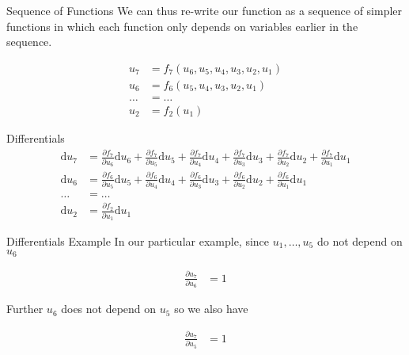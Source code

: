 \documentclass{beamer}
\begin{document}
\begin{frame}[fragile]{Sequence of Functions}
We can thus re-write our function as a sequence of simpler functions
in which each function only depends on variables earlier in the
sequence.

$$
\begin{aligned}
u_7    &= f_7(u_6, u_5, u_4, u_3, u_2, u_1) \\
u_6    &= f_6(u_5, u_4, u_3, u_2, u_1) \\
\ldots &= \ldots \\
u_2    &= f_2(u_1)
\end{aligned}
$$
\end{frame}

\begin{frame}[fragile]{Differentials}
$$
\begin{aligned}
\mathrm{d}u_7    &= \frac{\partial f_7}{\partial u_6} \mathrm{d} u_6 +
                    \frac{\partial f_7}{\partial u_5} \mathrm{d} u_5 +
                    \frac{\partial f_7}{\partial u_4} \mathrm{d} u_4 +
                    \frac{\partial f_7}{\partial u_3} \mathrm{d} u_3 +
                    \frac{\partial f_7}{\partial u_2} \mathrm{d} u_2 +
                    \frac{\partial f_7}{\partial u_1} \mathrm{d} u_1 \\
\mathrm{d}u_6    &= \frac{\partial f_6}{\partial u_5} \mathrm{d} u_5 +
                    \frac{\partial f_6}{\partial u_4} \mathrm{d} u_4 +
                    \frac{\partial f_6}{\partial u_3} \mathrm{d} u_3 +
                    \frac{\partial f_6}{\partial u_2} \mathrm{d} u_2 +
                    \frac{\partial f_6}{\partial u_1} \mathrm{d} u_1 \\
\ldots           &= \ldots \\
\mathrm{d}u_2    &= \frac{\partial f_2}{\partial u_1} \mathrm{d} u_1
\end{aligned}
$$
\end{frame}

\begin{frame}[fragile]{Differentials Example}
In our particular example, since $u_1, \dots, u_5$ do not depend on $u_6$

$$
\begin{aligned}
\frac{\partial u_7}{\partial u_6} &= 1
\end{aligned}
$$

Further $u_6$ does not depend on $u_5$ so we also have

$$
\begin{aligned}
\frac{\partial u_7}{\partial u_5} &= 1 \\
\end{aligned}
$$
\end{frame}
\end{document}
